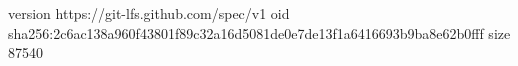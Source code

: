 version https://git-lfs.github.com/spec/v1
oid sha256:2c6ac138a960f43801f89c32a16d5081de0e7de13f1a6416693b9ba8e62b0fff
size 87540
